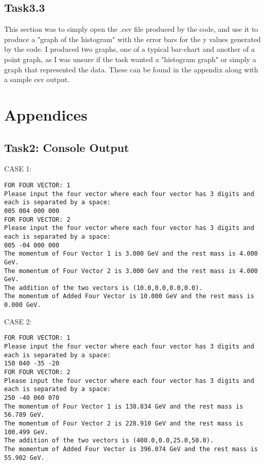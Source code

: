 \documentclass{article}
\begin{document}
\begin{multicols}{2}
	\subsection{Task3.3}
	This section was to simply open the .csv file produced by the code, and use it to produce a "graph of the histogram" with the error bars for the y values generated by the code. I produced two graphs, one of a typical bar-chart and another of a point graph, as I was unsure if the task wanted a "histogram graph" or simply a graph that represented the data. These can be found in the appendix along with a sample csv output.
\end{multicols}
\newpage

\section{Appendices}
\subsection{Task2: Console Output}
CASE 1:
\begin{lstlisting}
FOR FOUR VECTOR: 1
Please input the four vector where each four vector has 3 digits and each is separated by a space:	
005 004 000 000
FOR FOUR VECTOR: 2
Please input the four vector where each four vector has 3 digits and each is separated by a space:	
005 -04 000 000
The momentum of Four Vector 1 is 3.000 GeV and the rest mass is 4.000 GeV.
The momentum of Four Vector 2 is 3.000 GeV and the rest mass is 4.000 GeV.
The addition of the two vectors is (10.0,0.0,0.0,0.0).
The momentum of Added Four Vector is 10.000 GeV and the rest mass is 0.000 GeV.
\end{lstlisting}
CASE 2:
	\begin{lstlisting}
FOR FOUR VECTOR: 1
Please input the four vector where each four vector has 3 digits and each is separated by a space:	
150 040 -35 -20
FOR FOUR VECTOR: 2
Please input the four vector where each four vector has 3 digits and each is separated by a space:	
250 -40 060 070
The momentum of Four Vector 1 is 138.834 GeV and the rest mass is 56.789 GeV.
The momentum of Four Vector 2 is 228.910 GeV and the rest mass is 100.499 GeV.
The addition of the two vectors is (400.0,0.0,25.0,50.0).
The momentum of Added Four Vector is 396.074 GeV and the rest mass is 55.902 GeV.
	\end{lstlisting}
\end{document}
